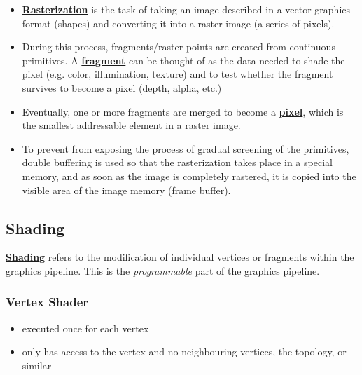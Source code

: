 \documentclass[twocolumn,landscape,10pt]{article}
\theoremstyle{definition}
\begin{document}
\begin{itemize}
    \item \underline{\textbf{Rasterization}} is the task of taking an image 
        described in a vector graphics format (shapes) and 
        converting it into a raster image (a series of pixels).
    \item During this process, fragments/raster points are created from 
        continuous primitives.  A \underline{\textbf{fragment}} 
        can be thought of as the data needed to shade the pixel 
        (e.g. color, illumination, texture) 
        and to test whether the fragment survives to become a pixel 
        (depth, alpha, etc.)
    \item Eventually, one or more fragments are merged to become a
        \underline{\textbf{pixel}}, which is the smallest addressable element
        in a raster image.
    \item To prevent from exposing the process of gradual screening of the
        primitives, double buffering is used so that 
        the rasterization takes place in a special memory,
        and as soon as the image is completely rastered, 
        it is copied into the visible area of the image memory (frame buffer).
\end{itemize} 

\subsection{Shading}
\underline{\textbf{Shading}} refers to the modification of individual 
vertices or fragments within the graphics pipeline.
This is the \emph{programmable} part of the graphics pipeline.

\subsubsection{Vertex Shader}
\begin{itemize}
    \item executed once for each vertex
    \item only has access to the vertex and no neighbouring vertices,
        the topology, or similar
\end{itemize} 
\end{document}

